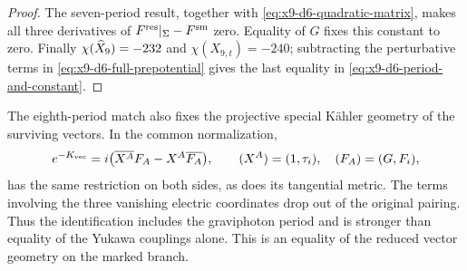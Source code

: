 \begin{proof}
The seven-period result, together with
\eqref{eq:x9-d6-quadratic-matrix}, makes all three derivatives of
$F^{\rm res}|_\Sigma-F^{\rm sm}$ zero. Equality of $G$ fixes this
constant to zero. Finally
$\chi(\widehat X_9)=-232$ and $\chi(X_{9,t})=-240$; subtracting the
perturbative terms in \eqref{eq:x9-d6-full-prepotential} gives the
last equality in \eqref{eq:x9-d6-period-and-constant}.
\end{proof}

The eighth-period match also fixes the projective special K\"ahler
geometry of the surviving vectors. In the common normalization,
\begin{equation}
 e^{-K_{\rm vec}}=i\bigl(\overline{X^A}F_A-X^A\overline{F_A}\bigr),
 \qquad (X^A)=(1,\tau_i),\quad (F_A)=(G,F_i),
 \label{eq:x9-d6-special-kahler}
\end{equation}
has the same restriction on both sides, as does its tangential
metric. The terms involving the three vanishing electric coordinates
drop out of the original pairing. Thus the identification includes
the graviphoton period and is stronger than equality of the Yukawa
couplings alone. This is an equality of the reduced vector geometry on the marked branch.
